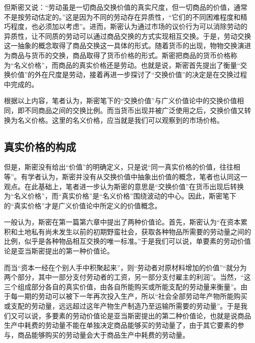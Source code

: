 但斯密又说：“劳动虽是一切商品交换价值的真实尺度，但一切商品的价值，通常不是按劳动估定的。”\cite[26]{YaDang*SiMiGuoFuLun2015}这是因为不同的劳动存在异质性，“它们的不同困难程度和精巧程度，也必须加以考虑”\cite[26]{YaDang*SiMiGuoFuLun2015}。进而，斯密认为通过市场的议价行为可以消除劳动的异质性，让不同质的劳动可以通过商品交换的方式实现相互交换\cite[26]{YaDang*SiMiGuoFuLun2015}。于是，劳动交换这一抽象的概念取得了商品交换这一具体的形式。随着货币的出现，物物交换演进为商品与货币的交换，商品取得了货币价格的形式。斯密把商品的货币价格称为“名义价格”，而商品的真实价格还是劳动\cite[28]{YaDang*SiMiGuoFuLun2015}。也就是说，斯密首先提出了衡量“交换价值”的外在尺度是劳动，接着再进一步探讨了“交换价值”的决定是在交换过程中完成的。

根据以上内容，笔者认为，斯密笔下的“交换价值”与广义价值论中的交换价值相同，即不同商品之间的交换比例。而当货币出现并被广泛使用之后，交换价值又转换为名义价格。这里的名义价格，应当就是我们可以观察到的市场价格\cite[293]{YueSeFu*XiongBiTeJingJiFenXiShiDi1Juan2017}。

\subsection{真实价格的构成}

但是，斯密没有给出“价值”的明确定义，只是说“同一真实价格的价值，往往相等”\cite[28]{YaDang*SiMiGuoFuLun2015}。有学者认为，斯密并没有从交换价值中抽象出价值的概念\cite[71]{ChenDaiSunCongGuDianJingJiXuePaiDaoMaKeSiRuoGanZhuYaoXueShuoFaZhanLueLun2014}，笔者也认同这一观点。在此基础上，笔者进一步认为斯密的意思是“交换价值”在货币出现后转换为“名义价格”，而“真实价格”是“名义价格”围绕波动的中心\cite[52]{YaDang*SiMiGuoFuLun2015}。因此，斯密笔下的“真实价格”才是广义价值论中所定义的价值概念。

一般认为，斯密在第一篇第六章中提出了两种价值论\cite[97]{YanZhiJieXiFangJingJiXueShuoShiJiaoChengDiErBan2013}\cite[126]{CaiJiMingCongGuDianZhengZhiJingJiXueDaoZhongGuoTeSeSheHuiZhuYiZhengZhiJingJiXueJiYuZhongGuoShiJiaoDeZhengZhiJingJiXueYanBianShangCe2023}。首先，斯密认为“在资本累积和土地私有尚未发生以前的初期野蛮社会，获取各种物品所需要的劳动量之间的比例，似乎是各种物品相互交换的唯一标准。”\cite[41]{YaDang*SiMiGuoFuLun2015}于是我们可以说，单要素的劳动价值论是亚当斯密提出的第一种价值论。

而当“资本一经在个别人手中积聚起来”，则“劳动者对原材料增加的价值”“就分为两个部分，其中一部分支付劳动者的工资，另一部分支付雇主的利润”\cite[42]{YaDang*SiMiGuoFuLun2015}。当然，“这三个组成部分各自的真实价值，由各自所能购买或所能支配的劳动量来衡量”\cite[43-44]{YaDang*SiMiGuoFuLun2015}。由于每一期的劳动可以被下一年再次投入生产，所以“社会全部劳动年产物所能购买或支配的劳动量，远远超过这年产物生产制造乃至运输所需要的劳动量”\cite[48]{YaDang*SiMiGuoFuLun2015}。于是我们又可以说，多要素的劳动价值论是亚当斯密提出的第二种价值论，也就是说商品生产中耗费的劳动量不能在单独决定商品能够买的劳动量了，由于其它要素的参与，商品能够购买的劳动量会大于商品生产中耗费的劳动量\cite[138]{CaiJiMingCongGuDianDaoXianDaiZhengZhiJingJiXueGaiNianDeYanBianJianPingXinZhengZhiJingJiXueDeFaZhan2012}。

